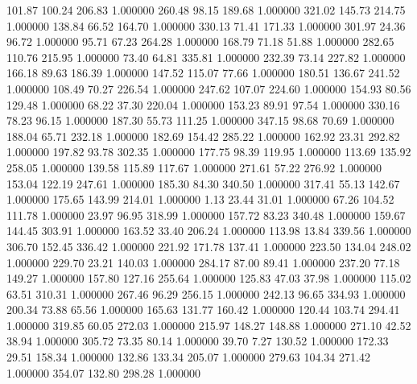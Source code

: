     101.87    100.24    206.83  1.000000
    260.48     98.15    189.68  1.000000
    321.02    145.73    214.75  1.000000
    138.84     66.52    164.70  1.000000
    330.13     71.41    171.33  1.000000
    301.97     24.36     96.72  1.000000
     95.71     67.23    264.28  1.000000
    168.79     71.18     51.88  1.000000
    282.65    110.76    215.95  1.000000
     73.40     64.81    335.81  1.000000
    232.39     73.14    227.82  1.000000
    166.18     89.63    186.39  1.000000
    147.52    115.07     77.66  1.000000
    180.51    136.67    241.52  1.000000
    108.49     70.27    226.54  1.000000
    247.62    107.07    224.60  1.000000
    154.93     80.56    129.48  1.000000
     68.22     37.30    220.04  1.000000
    153.23     89.91     97.54  1.000000
    330.16     78.23     96.15  1.000000
    187.30     55.73    111.25  1.000000
    347.15     98.68     70.69  1.000000
    188.04     65.71    232.18  1.000000
    182.69    154.42    285.22  1.000000
    162.92     23.31    292.82  1.000000
    197.82     93.78    302.35  1.000000
    177.75     98.39    119.95  1.000000
    113.69    135.92    258.05  1.000000
    139.58    115.89    117.67  1.000000
    271.61     57.22    276.92  1.000000
    153.04    122.19    247.61  1.000000
    185.30     84.30    340.50  1.000000
    317.41     55.13    142.67  1.000000
    175.65    143.99    214.01  1.000000
      1.13     23.44     31.01  1.000000
     67.26    104.52    111.78  1.000000
     23.97     96.95    318.99  1.000000
    157.72     83.23    340.48  1.000000
    159.67    144.45    303.91  1.000000
    163.52     33.40    206.24  1.000000
    113.98     13.84    339.56  1.000000
    306.70    152.45    336.42  1.000000
    221.92    171.78    137.41  1.000000
    223.50    134.04    248.02  1.000000
    229.70     23.21    140.03  1.000000
    284.17     87.00     89.41  1.000000
    237.20     77.18    149.27  1.000000
    157.80    127.16    255.64  1.000000
    125.83     47.03     37.98  1.000000
    115.02     63.51    310.31  1.000000
    267.46     96.29    256.15  1.000000
    242.13     96.65    334.93  1.000000
    200.34     73.88     65.56  1.000000
    165.63    131.77    160.42  1.000000
    120.44    103.74    294.41  1.000000
    319.85     60.05    272.03  1.000000
    215.97    148.27    148.88  1.000000
    271.10     42.52     38.94  1.000000
    305.72     73.35     80.14  1.000000
     39.70      7.27    130.52  1.000000
    172.33     29.51    158.34  1.000000
    132.86    133.34    205.07  1.000000
    279.63    104.34    271.42  1.000000
    354.07    132.80    298.28  1.000000
